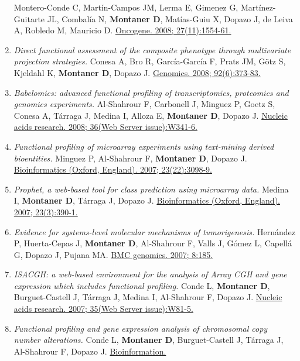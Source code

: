 \begin{enumerate}
  Montero-Conde C, Martín-Campos JM, Lerma E, Gimenez G,
  Martínez-Guitarte JL, Combalía N, \textbf{Montaner D}, Matías-Guiu X,
  Dopazo J, de Leiva A, Robledo M, Mauricio D.
  \href{http://www.ncbi.nlm.nih.gov//pubmed/17873908}{Oncogene. 2008;
  27(11):1554-61.}
\item
  \emph{Direct functional assessment of the composite phenotype through
  multivariate projection strategies.} Conesa A, Bro R, García-García F,
  Prats JM, Götz S, Kjeldahl K, \textbf{Montaner D}, Dopazo J.
  \href{http://www.ncbi.nlm.nih.gov//pubmed/18652888}{Genomics. 2008;
  92(6):373-83.}
\item
  \emph{Babelomics: advanced functional profiling of transcriptomics,
  proteomics and genomics experiments.} Al-Shahrour F, Carbonell J,
  Minguez P, Goetz S, Conesa A, Tárraga J, Medina I, Alloza E,
  \textbf{Montaner D}, Dopazo J.
  \href{http://www.ncbi.nlm.nih.gov//pubmed/18515841}{Nucleic acids
  research. 2008; 36(Web Server issue):W341-6.}
\item
  \emph{Functional profiling of microarray experiments using text-mining
  derived bioentities.} Minguez P, Al-Shahrour F, \textbf{Montaner D},
  Dopazo J.
  \href{http://www.ncbi.nlm.nih.gov//pubmed/17855415}{Bioinformatics
  (Oxford, England). 2007; 23(22):3098-9.}
\item
  \emph{Prophet, a web-based tool for class prediction using microarray
  data.} Medina I, \textbf{Montaner D}, Tárraga J, Dopazo J.
  \href{http://www.ncbi.nlm.nih.gov//pubmed/17138587}{Bioinformatics
  (Oxford, England). 2007; 23(3):390-1.}
\item
  \emph{Evidence for systems-level molecular mechanisms of
  tumorigenesis.} Hernández P, Huerta-Cepas J, \textbf{Montaner D},
  Al-Shahrour F, Valls J, Gómez L, Capellá G, Dopazo J, Pujana MA.
  \href{http://www.ncbi.nlm.nih.gov//pubmed/17584915}{BMC genomics.
  2007; 8:185.}
\item
  \emph{ISACGH: a web-based environment for the analysis of Array CGH
  and gene expression which includes functional profiling.} Conde L,
  \textbf{Montaner D}, Burguet-Castell J, Tárraga J, Medina I,
  Al-Shahrour F, Dopazo J.
  \href{http://www.ncbi.nlm.nih.gov//pubmed/17468499}{Nucleic acids
  research. 2007; 35(Web Server issue):W81-5.}
\item
  \emph{Functional profiling and gene expression analysis of chromosomal
  copy number alterations.} Conde L, \textbf{Montaner D},
  Burguet-Castell J, Tárraga J, Al-Shahrour F, Dopazo J.
  \href{http://www.ncbi.nlm.nih.gov//pubmed/17597935}{Bioinformation.
}
\end{enumerate}
